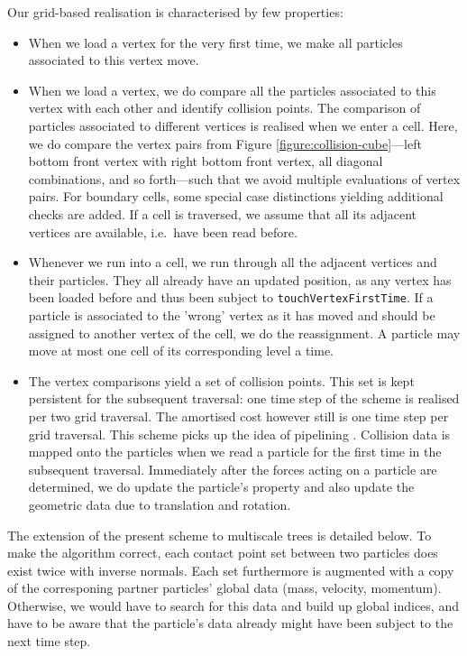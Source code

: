 \documentclass[times,12pt]{article}
\begin{document}
Our grid-based realisation is characterised by few properties:
\begin{itemize}
  \item When we load a vertex for the very first time, we make all particles
  associated to this vertex move. 
  \item When we load a vertex, we do compare all the particles associated to
  this vertex with each other and identify collision points. The comparison of
  particles associated to different vertices is realised when we enter a cell.
  Here, we do compare the vertex pairs from Figure \ref{figure:collision-cube}---left bottom
  front vertex with right bottom front vertex, all diagonal combinations, and
  so forth---such that we avoid multiple evaluations of vertex pairs. For 
  boundary cells, some special case distinctions yielding additional checks are
  added. If a cell is traversed, we assume that all its adjacent vertices are
  available, i.e.~have been read before.
  \item Whenever we run into a cell, we run through all the adjacent vertices
  and their particles. They all already have an updated position, as any vertex
  has been loaded before and thus been subject to \texttt{touchVertexFirstTime}.
  If a particle is associated to the 'wrong' vertex as it has moved and should 
  be assigned to another vertex of the cell, we do the reassignment. A particle
  may move at most one cell of its corresponding level a time.
  \item The vertex comparisons yield a set of collision points. This set is kept
  persistent for the subsequent traversal: one time step of the scheme is
  realised per two grid traversal. The amortised cost however still is one time
  step per grid traversal. This scheme picks up the idea of pipelining
  \cite{Plimpton1995}. Collision data is mapped onto the particles when we read a
  particle for the first time in the subsequent traversal. Immediately after the
  forces acting on a particle are determined, we do update the particle's
  property and also update the geometric data due to translation and rotation.
\end{itemize}

\noindent
The extension of the present scheme to multiscale trees is detailed below.
To make the algorithm correct, each contact point set between two particles does
exist twice with inverse normals.
Each set furthermore is augmented with a copy of the corresponing partner
particles' global data (mass, velocity, momentum).
Otherwise, we would have to search for this data and build up global indices,
and have to be aware that the particle's data already might have been subject to
the next time step.
\end{document}

